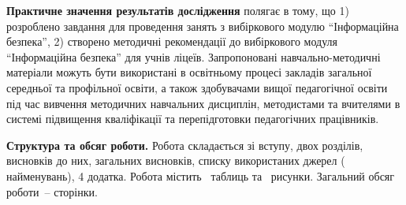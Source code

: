 \textbf{Практичне значення результатів дослідження} полягає в тому, що 1) розроблено завдання для проведення занять з вибіркового модулю “Інформаційна безпека”, 2) створено методичні рекомендації до вибіркового модуля ``Інформаційна безпека'' для учнів ліцеїв. Запропоновані навчально-методичні матеріали можуть бути використані в освітньому процесі закладів загальної середньої та профільної освіти, а також здобувачами вищої педагогічної освіти під час вивчення методичних навчальних дисциплін, методистами та вчителями в системі підвищення кваліфікації та перепідготовки педагогічних працівників.


\textbf{Структура та обсяг роботи.} Робота складається зі
вступу, двох розділів, висновків до них, загальних висновків, списку використаних джерел ( найменувань), 4 додатка. Робота містить \totaltables\  таблиць та \totalfigures\ рисунки.
Загальний обсяг роботи~-- \pageref{last_page} 
сторінки.




